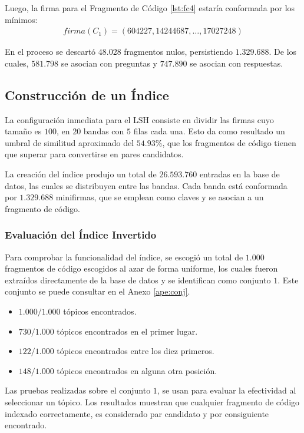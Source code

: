 Luego, la firma para el Fragmento de Código \ref{lst:fc4} estaría conformada por los mínimos:
\begin{gather*}
firma(C_1) = (604227, 14244687, \dots, 17027248)
\end{gather*}

En el proceso se descartó $48.028$ fragmentos nulos, persistiendo $1.329.688$.
De los cuales, $581.798$ se asocian con preguntas y $747.890$ se asocian con respuestas.

\subsection{Construcción de un Índice}
\label{subsec:DesConInd}

La configuración inmediata para el \ac{LSH} consiste en dividir las
firmas cuyo tamaño es $100$, en $20$ bandas con $5$ filas cada una.
Esto da como resultado un umbral de similitud aproximado del $54.93\%$,
que los fragmentos de código tienen que superar para convertirse en pares candidatos.

La creación del índice produjo un total de $26.593.760$
entradas en la base de datos, las cuales se distribuyen entre las bandas.
Cada banda está conformada por $1.329.688$ minifirmas,
que se emplean como claves y se asocian a un fragmento de código.

\subsubsection{Evaluación del Índice Invertido}

Para comprobar la funcionalidad del índice,
se escogió un total de $1.000$ fragmentos de código escogidos al azar de forma uniforme,
los cuales fueron extraídos directamente de la base de datos y
se identifican como conjunto $1$. Este conjunto se puede consultar en el Anexo \ref{ape:conj}.


\begin{itemize}
  \item $1.000/1.000$ tópicos encontrados.
  \item $730/1.000$ tópicos encontrados en el primer lugar.
  \item $122/1.000$ tópicos encontrados entre los diez primeros.
  \item $148/1.000$ tópicos encontrados en alguna otra posición.
\end{itemize}

Las pruebas realizadas sobre el conjunto $1$,
se usan para evaluar la efectividad al seleccionar un tópico.
Los resultados muestran que cualquier fragmento de código indexado correctamente,
es considerado par candidato y por consiguiente encontrado.

